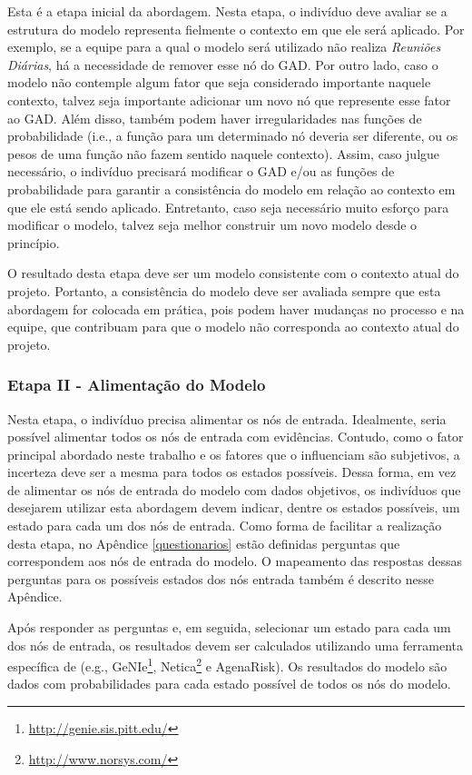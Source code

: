 Esta é a etapa inicial da abordagem. Nesta etapa, o indivíduo deve avaliar se a estrutura do modelo representa fielmente o contexto em que ele será aplicado. Por exemplo, se a equipe para a qual o modelo será utilizado não realiza \textit{Reuniões Diárias}, há a necessidade de remover esse nó do GAD. Por outro lado, caso o modelo não contemple algum fator que seja considerado importante naquele contexto, talvez seja importante adicionar um novo nó que represente esse fator ao GAD. Além disso, também podem haver irregularidades nas funções de probabilidade (i.e., a função para um determinado nó deveria ser diferente, ou os pesos de uma função não fazem sentido naquele contexto). Assim, caso julgue necessário, o indivíduo precisará modificar o GAD e/ou as funções de probabilidade para garantir a consistência do modelo em relação ao contexto em que ele está sendo aplicado. Entretanto, caso seja necessário muito esforço para modificar o modelo, talvez seja melhor construir um novo modelo desde o princípio.

O resultado desta etapa deve ser um modelo consistente com o contexto atual do projeto. Portanto, a consistência do modelo deve ser avaliada sempre que esta abordagem for colocada em prática, pois podem haver mudanças no processo e na equipe, que contribuam para que o modelo não corresponda ao contexto atual do projeto.

\subsubsection{Etapa II - Alimentação do Modelo}
\label{descricao:alimentacao}

Nesta etapa, o indivíduo precisa alimentar os nós de entrada. Idealmente, seria possível alimentar todos os nós de entrada com evidências. Contudo, como o fator principal abordado neste trabalho e os fatores que o influenciam são subjetivos, a incerteza deve ser a mesma para todos os estados possíveis. Dessa forma, em vez de alimentar os nós de entrada do modelo com dados objetivos, os indivíduos que desejarem utilizar esta abordagem devem indicar, dentre os estados possíveis, um estado para cada um dos nós de entrada. Como forma de facilitar a realização desta etapa, no Apêndice \ref{questionarios} estão definidas perguntas que correspondem aos nós de entrada do modelo. O mapeamento das respostas dessas perguntas para os possíveis estados dos nós entrada também é descrito nesse Apêndice.

Após responder as perguntas e, em seguida, selecionar um estado para cada um dos nós de entrada, os resultados devem ser calculados utilizando uma ferramenta específica de (e.g., GeNIe\footnote{\url{http://genie.sis.pitt.edu/}}, Netica\footnote{\url{http://www.norsys.com/}} e AgenaRisk). Os resultados do modelo são dados com probabilidades para cada estado possível de todos os nós do modelo.

